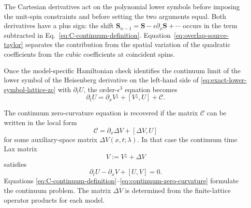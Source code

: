 The Cartesian derivatives act on the polynomial lower symbols before
imposing the unit-spin constraints and before setting the two arguments
equal.  Both derivatives have a plus sign:
the shift $\boldsymbol S_{n-1}=\boldsymbol S-\epsilon\partial_x
\boldsymbol S+\cdots$ occurs in the term subtracted in
Eq.~\eqref{eq:C-continuum-definition}.  Equation~\eqref{eq:overlap-source-taylor}
separates the contribution from the spatial variation of the quadratic
coefficients from the cubic coefficients at coincident spins.

Once the model-specific Hamiltonian check identifies the continuum limit of
the lower symbol of the Heisenberg derivative on the left-hand side of
\eqref{eq:exact-lower-symbol-lattice-zc} with $\partial_tU$, the
order-$\epsilon^3$ equation becomes
\begin{equation}
\partial_t U
=
\partial_xV^{\downarrow}
+[V^{\downarrow},U]
+\mathcal C.
\label{eq:continuum-zc-with-C}
\end{equation}

The continuum zero-curvature equation is recovered if the matrix
$\mathcal C$ can be written in the local form
\begin{equation}
\mathcal C
=
\partial_x\Delta V+[\Delta V,U]
\label{eq:C-absorbable-condition}
\end{equation}
for some auxiliary-space matrix $\Delta V(x,t;\lambda)$.  In that case the
continuum time Lax matrix
\begin{equation}
V:=V^{\downarrow}+\Delta V
\label{eq:corrected-continuum-V-definition}
\end{equation}
satisfies
\begin{equation}
\partial_tU-\partial_xV+[U,V]=0.
\label{eq:continuum-zero-curvature}
\end{equation}
Equations \eqref{eq:C-continuum-definition}--\eqref{eq:continuum-zero-curvature}
formulate the continuum problem.  The matrix $\Delta V$ is determined from
the finite-lattice operator products for each model.
